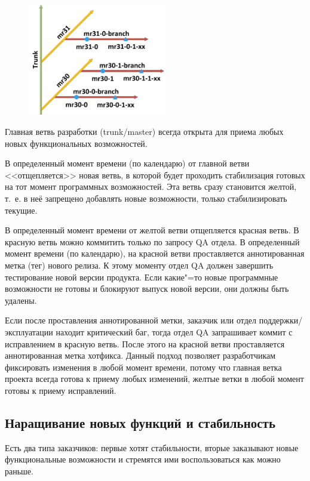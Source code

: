 \documentclass[10pt, a5paper]{article}
\begin{document}
\begin{figure}
  \centering
  \includegraphics[width=6cm]{05_zones.png}
\end{figure}

Главная ветвь разработки (trunk/master) всегда открыта для приема любых новых функциональных возможностей.

В определенный момент времени (по календарю) от главной ветви <<отщепляется>> новая ветвь, в которой будет проходить стабилизация готовых на тот момент программных возможностей. Эта ветвь сразу становится желтой, т.~е. в неё запрещено добавлять новые возможности, только стабилизировать текущие.

В определенный момент времени от желтой ветви отщепляется красная ветвь. В красную ветвь можно коммитить только по запросу QA отдела.
В определенный момент времени (по календарю), на красной ветви проставляется аннотированная метка (тег) нового релиза.
К этому моменту отдел QA должен завершить тестирование новой версии продукта. Если какие"=то новые программные возможности не готовы и блокируют выпуск новой версии, они должны быть удалены.

Если после проставления аннотированной метки, заказчик или отдел поддержки/эксплуатации находит критический баг, тогда отдел QA запрашивает коммит с исправлением в красную ветвь. После этого на красной ветви проставляется аннотированная метка хотфикса.
Данный подход позволяет разработчикам фиксировать изменения в любой момент времени, потому что главная ветка проекта всегда готова к приему любых изменений, желтые ветки в любой момент готовы к приему исправлений.

\subsection*{Наращивание новых функций и стабильность}

Есть два типа заказчиков: первые хотят стабильности, вторые заказывают новые функциональные возможности и стремятся ими воспользоваться как можно раньше.
\end{document}
